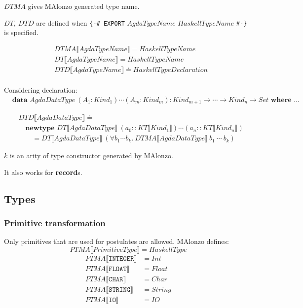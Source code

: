 \(DTMA\) gives MAlonzo generated type name.

\(DT,\ DTD\) are defined when \texttt{\{-\# EXPORT} \(AgdaTypeName\) \(HaskellTypeName\) \texttt{\#-\}} is specified.

\begin{align*}
   &DTMA\llbracket AgdaTypeName \rrbracket = HaskellTypeName\\
   &DT\llbracket AgdaTypeName \rrbracket = HaskellTypeName\\
   &DTD\llbracket AgdaTypeName \rrbracket \doteq HaskellTypeDeclaration\\
\end{align*}

Considering declaration:
\begin{align*}
   &\textbf{data } AgdaDataType\ (A_1 : Kind_1) \cdots (A_m : Kind_m) :
      Kind_{m+1} \rightarrow \cdots \rightarrow Kind_n \rightarrow Set \textbf{ where } \ldots
\end{align*}

\begin{align*}
   &DTD\llbracket AgdaDataType \rrbracket \doteq\\
   &\quad\textbf{newtype } DT\llbracket AgdaDataType \rrbracket\ (a_0 :: KT\llbracket Kind_1 \rrbracket)
      \cdots (a_n :: KT\llbracket Kind_n \rrbracket)\\
   &\quad\quad = DT\llbracket AgdaDataType \rrbracket\ (\forall b_1 \cdots b_k.\ DTMA\llbracket AgdaDataType \rrbracket\ b_1\ \cdots\ b_k)
\end{align*}

\(k\) is an arity of type constructor generated by MAlonzo.

It also works for \textbf{record}s.

\subsection{Types}

\subsubsection{Primitive transformation}

Only primitives that are used for postulates are allowed.  MAlonzo defines:
\[
   PTMA\llbracket PrimitiveType \rrbracket = HaskellType
\]
\begin{align*}
   PTMA\llbracket \texttt{INTEGER} \rrbracket &= Int\\
   PTMA\llbracket \texttt{FLOAT} \rrbracket &= Float\\
   PTMA\llbracket \texttt{CHAR} \rrbracket &= Char\\
   PTMA\llbracket \texttt{STRING} \rrbracket &= String\\
   PTMA\llbracket \texttt{IO} \rrbracket &= IO
\end{align*}

